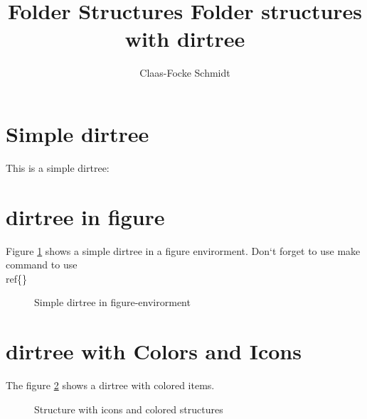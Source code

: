 \documentclass[10pt,a4paper]{article}
\author{Claas-Focke Schmidt}
\title{Folder Structures }
\begin{document}
\title{Folder structures with dirtree}


\section{Simple dirtree}
This is a simple dirtree: 


\section{dirtree in figure}
Figure \ref{fig:SmpldirInFigure} shows a simple dirtree in a figure envirorment. Don`t forget to use make command to use \\ref\{\}
\begin{figure}[h]
\caption{Simple dirtree in figure-envirorment}
\label{fig:SmpldirInFigure}
\end{figure}


\section{dirtree with Colors and Icons}
The figure \ref{fig:moreComplexDir} shows a dirtree with colored items. 
\begin{figure}[h]
\caption{Structure with icons and colored structures}
\label{fig:moreComplexDir}
\end{figure}
\end{document}
